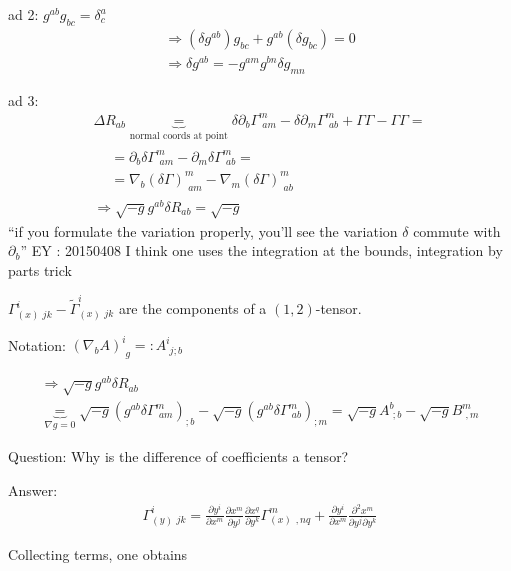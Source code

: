 \documentclass[10pt, twoside]{amsart}
\begin{document}
\begin{multicols*}{2}
ad 2: $g^{ab}g_{bc} = \delta^a_c$
\[
\begin{gathered}
\Longrightarrow (\delta g^{ab})g_{bc} + g^{ab}(\delta g_{bc}) = 0  \\
 \Longrightarrow \delta g^{ab} = -g^{am} g^{bn} \delta g_{mn}
\end{gathered}
\]

ad 3: 
\[
\begin{gathered}
  \Delta R_{ab} \underbrace{=}_{\text{normal coords at point}} \delta \partial_b \Gamma^m_{ \, \, am} - \delta \partial_m \Gamma^m_{ \, \, ab} + \Gamma \Gamma - \Gamma \Gamma = \\
  \begin{aligned}
    & = \partial_b \delta \Gamma^m_{ \, \, am} - \partial_m \delta \Gamma^m_{ \, \, ab } = \\  
    & = \nabla_b (\delta \Gamma)^m_{ \, \, am} - \nabla_m (\delta \Gamma)^m_{ \, \, ab}
\end{aligned} \\
\Longrightarrow \sqrt{-g} g^{ab} \delta R_{ab} = \sqrt{-g}
\end{gathered}
\]
``if you formulate the variation properly, you'll see the variation $\delta$ commute with $\partial _b$'' EY : 20150408 I think one uses the integration at the bounds, integration by parts trick

$\Gamma^i_{(x) \, \, jk } - \widetilde{\Gamma}^i_{ (x) \, \, jk }$ are the components of a $(1,2)$-tensor.

Notation: $(\nabla_b A)^i_{ \, \, g} =: A^i_{ \, \, j;b}$

\[
\begin{gathered}
\Longrightarrow \sqrt{-g} g^{ab} \delta R_{ab}  \\
\underbrace{=}_{ \nabla g = 0 } \sqrt{-g} (g^{ab} \delta \Gamma^m_{ \, \, am} )_{;b} - \sqrt{-g} (g^{ab} \delta \Gamma^m_{ \, \, ab} )_{ ; m} = \sqrt{-g} A^b_{ \, \, ; b} - \sqrt{-g} B^m_{ \, \, , m }
\end{gathered}
\]

Question: Why is the difference of coefficients a tensor?

Answer:
\[
\begin{aligned}
\Gamma_{(y) \, \, jk}^i = \frac{ \partial y^i}{ \partial x^m} \frac{ \partial x^m}{ \partial y^j} \frac{ \partial x^q}{ \partial y^k} \Gamma^m_{(x) \,\ , nq} + \frac{ \partial y^i}{ \partial x^m} \frac{ \partial^2 x^m}{ \partial y^j \partial y^k}
\end{aligned}
\]

Collecting terms, one obtains


\end{multicols*}
\end{document}
